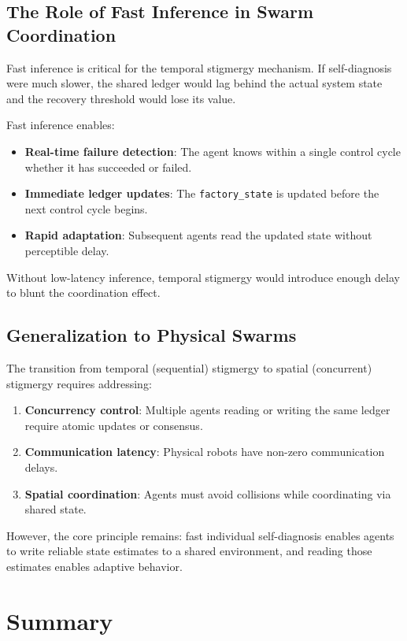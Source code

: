 \documentclass[12pt,a4paper,oneside]{report}
\begin{document}
\subsection{The Role of Fast Inference in Swarm Coordination}

Fast inference is critical for the temporal stigmergy mechanism. If self-diagnosis were much slower, the shared ledger would lag behind the actual system state and the recovery threshold would lose its value.

Fast inference enables:
\begin{itemize}
    \item \textbf{Real-time failure detection}: The agent knows within a single control cycle whether it has succeeded or failed.
    \item \textbf{Immediate ledger updates}: The \texttt{factory\_state} is updated before the next control cycle begins.
    \item \textbf{Rapid adaptation}: Subsequent agents read the updated state without perceptible delay.
\end{itemize}

Without low-latency inference, temporal stigmergy would introduce enough delay to blunt the coordination effect.

\subsection{Generalization to Physical Swarms}

The transition from temporal (sequential) stigmergy to spatial (concurrent) stigmergy requires addressing:
\begin{enumerate}
    \item \textbf{Concurrency control}: Multiple agents reading or writing the same ledger require atomic updates or consensus.
    \item \textbf{Communication latency}: Physical robots have non-zero communication delays.
    \item \textbf{Spatial coordination}: Agents must avoid collisions while coordinating via shared state.
\end{enumerate}

However, the core principle remains: fast individual self-diagnosis enables agents to write reliable state estimates to a shared environment, and reading those estimates enables adaptive behavior.

\section{Summary}
\end{document}
